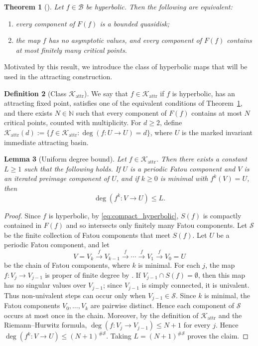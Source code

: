 \documentclass[11pt,a4paper, oneside]{amsart}
\newtheorem{thm}{Theorem}[section]
\newtheorem{lemma}[thm]{Lemma}
\theoremstyle{definition}
\newtheorem{defn}[thm]{Definition}
\theoremstyle{remark}
\numberwithin{equation}{section}
\def\B{{\mathcal{B}}}
\renewcommand{\geq}{\geqslant}
\renewcommand{\leq}{\leqslant}
\renewcommand{\ge}{\geqslant}
\newcommand{\attr}{{\text{attr}}}
\begin{document}
\begin{thm}[{\cite[Theorems 1.2 and 1.10]{BFR15_hyperbolic}}]\label{thm:bounded_hyperbolic} Let $f\in \B$ be hyperbolic. Then the following are equivalent:
	\begin{enumerate}[leftmargin=8mm]
		\item every component of $F(f)$ is a bounded quasidisk;
		\item the map $f$ has no asymptotic values, and every component of $F(f)$ contains at most finitely many critical points.
	\end{enumerate}	
\end{thm}

Motivated by this result, we introduce the class of hyperbolic maps that will be used in the attracting construction.
\begin{defn}[Class $\mathscr K_\attr$]
	\label{Def:Kattr}
	We say that $f\in\mathscr K_\attr$ if $f$ is hyperbolic, has an attracting fixed point, satisfies one of the equivalent conditions of Theorem~\ref{thm:bounded_hyperbolic}, and there exists $N\in\mathbb N$ such that every component of $F(f)$ contains at most $N$ critical points, counted with multiplicity. For $d\ge2$, define $\mathscr K_{\attr}(d):=\{f\in\mathscr K_{\attr}:\deg(f\colon U\to U)=d\}$, where $U$ is the marked invariant immediate attracting basin.
\end{defn}

\begin{lemma}[Uniform degree bound]
	\label{Lem:UnivComp}
	Let $f\in\mathscr K_\attr$. Then there exists a constant $L\geq1$ such that
	the following holds. If $U$ is a periodic Fatou component and $V$ is an
	iterated preimage component of $U$, and if $k\geq0$ is minimal with
	$f^k(V)=U$, then
	\[
	\deg(f^k\colon V\to U)\leq L.
	\]
\end{lemma}
\begin{proof}
Since $f$ is hyperbolic, by \eqref{eq:compact_hyperbolic}, $S(f)$ is compactly contained in $F(f)$ and so intersects only finitely many Fatou components. Let $\mathcal S$ be the finite collection of Fatou components that meet $S(f)$. Let $U$ be a periodic Fatou component, and let 
	\[
	V=V_k \xrightarrow{f} V_{k-1}\xrightarrow{f}\cdots
	\xrightarrow{f}V_1\xrightarrow{f}V_0=U
	\]
	be the chain of Fatou components, where $k$ is minimal. For each $j$, the map $f\colon V_j\to V_{j-1}$ is proper of finite degree by \cite[Proposition~2.8]{BFR15_hyperbolic}. If
	$V_{j-1}\cap S(f)=\emptyset$, then this map has no singular values over $V_{j-1}$; since $V_{j-1}$ is simply connected, it is univalent. Thus non-univalent steps can occur only when $V_{j-1}\in\mathcal S$. Since $k$ is minimal, the Fatou components
	$V_0,\ldots,V_k$ are pairwise distinct. Hence each component of
	$\mathcal S$ occurs at most once in the chain. Moreover, by the definition of $\mathscr K_\attr$ and the
	Riemann--Hurwitz formula, $\deg(f\colon V_j\to V_{j-1})\leq N+1$
	for every $j$. Hence $\deg(f^k\colon V\to U) \leq (N+1)^{\#\mathcal S}.$ Taking $L=(N+1)^{\#\mathcal S}$ proves the claim.
\end{proof}
\end{document}

